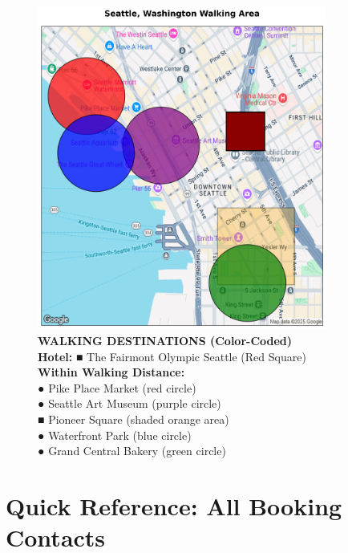 \documentclass[
  10pt,
]{article}
\begin{document}
\begin{figure}[h]
\centering
\includegraphics[width=0.85\textwidth]{images/seattle_wa_walking_map.png}
\caption{\textbf{\textcolor{primary}{WALKING DESTINATIONS (Color-Coded)}} \\ 
\textbf{\textcolor{secondary}{Hotel:}} \textcolor{mapred}{■} The Fairmont Olympic Seattle (Red Square) \\
\textbf{\textcolor{secondary}{Within Walking Distance:}} \\
\textcolor{mapred}{●} \textcolor{mapred}{Pike Place Market} (red circle) \\
\textcolor{mappurple}{●} \textcolor{mappurple}{Seattle Art Museum} (purple circle) \\
\textcolor{maporange}{■} \textcolor{maporange}{Pioneer Square} (shaded orange area) \\
\textcolor{mapblue}{●} \textcolor{mapblue}{Waterfront Park} (blue circle) \\
\textcolor{mapgreen}{●} \textcolor{mapgreen}{Grand Central Bakery} (green circle)}
\end{figure}

\newpage

\section{\texorpdfstring{\textcolor{primary}{Quick Reference: All Booking Contacts}}{}}\label{section-53}
\end{document}

